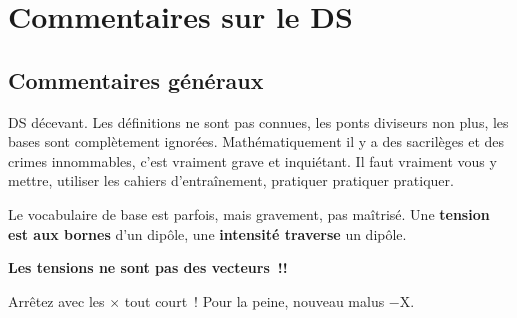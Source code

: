 \documentclass[a4paper, 11pt, final, garamond]{book}
\begin{document}
\setcounter{chapter}{1}

\def\lspace{25}

\chapter{Commentaires sur le DS }

\section{Commentaires généraux}

DS décevant. Les définitions ne sont pas connues, les ponts diviseurs non plus,
les bases sont complètement ignorées. Mathématiquement il y a des sacrilèges et
des crimes innommables, c'est vraiment grave et inquiétant. Il faut vraiment
vous y mettre, utiliser les cahiers d'entraînement, pratiquer pratiquer
pratiquer.

Le vocabulaire de base est parfois, mais gravement, pas maîtrisé. Une
\textbf{tension est aux bornes} d'un dipôle, une \textbf{intensité traverse} un
dipôle.


\textbf{Les tensions ne sont pas des vecteurs~!!}

\begin{center}
\end{center}
Arrêtez avec les $\times$ tout court~! Pour la peine, nouveau malus $-$X.
\end{document}
